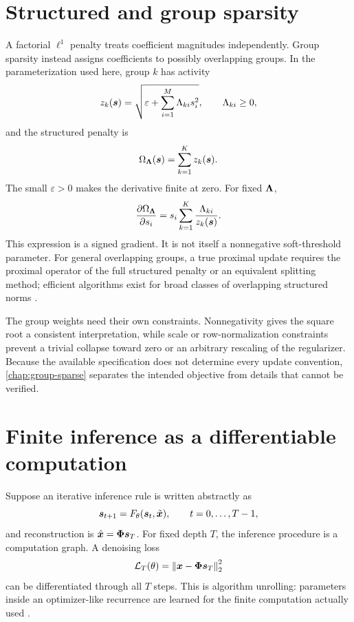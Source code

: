 \section{Structured and group sparsity}
\label{sec:framework-group}

A factorial $\ell^1$ penalty treats coefficient magnitudes independently. Group sparsity instead assigns coefficients to possibly overlapping groups. In the parameterization used here, group $k$ has activity
\begin{equation}
\label{eq:group-activity-primer}
z_k(\bm{s})=
\sqrt{\varepsilon+\sum_{i=1}^{M}\Lambda_{ki}s_i^2},
\qquad \Lambda_{ki}\geq 0,
\end{equation}
and the structured penalty is
\begin{equation}
\label{eq:group-penalty-primer}
\Omega_{\bm{\Lambda}}(\bm{s})
=\sum_{k=1}^{K}z_k(\bm{s}).
\end{equation}
The small $\varepsilon>0$ makes the derivative finite at zero. For fixed $\bm{\Lambda}$,
\begin{equation}
\label{eq:group-gradient-primer}
\frac{\partial\Omega_{\bm{\Lambda}}}{\partial s_i}
=s_i\sum_{k=1}^{K}\frac{\Lambda_{ki}}{z_k(\bm{s})}.
\end{equation}
This expression is a signed gradient. It is not itself a nonnegative soft-threshold parameter. For general overlapping groups, a true proximal update requires the proximal operator of the full structured penalty or an equivalent splitting method; efficient algorithms exist for broad classes of overlapping structured norms \citep{jenatton11,mairal11}.

The group weights need their own constraints. Nonnegativity gives the square root a consistent interpretation, while scale or row-normalization constraints prevent a trivial collapse toward zero or an arbitrary rescaling of the regularizer. Because the available specification does not determine every update convention, \cref{chap:group-sparse} separates the intended objective from details that cannot be verified.

\section{Finite inference as a differentiable computation}
\label{sec:framework-unrolling}

Suppose an iterative inference rule is written abstractly as
\begin{equation}
\label{eq:unrolled-state}
\bm{s}_{t+1}=F_{\theta}(\bm{s}_t,\tilde{\bm{x}}),
\qquad t=0,\ldots,T-1,
\end{equation}
and reconstruction is $\hat{\bm{x}}=\bm{\Phi}\bm{s}_T$. For fixed depth $T$, the inference procedure is a computation graph. A denoising loss
\begin{equation}
\label{eq:unrolled-loss}
\mathcal{L}_T(\theta)
=\left\lVert \bm{x}-\bm{\Phi}\bm{s}_T\right\rVert_2^2
\end{equation}
can be differentiated through all $T$ steps. This is algorithm unrolling: parameters inside an optimizer-like recurrence are learned for the finite computation actually used \citep{gregor10}.

